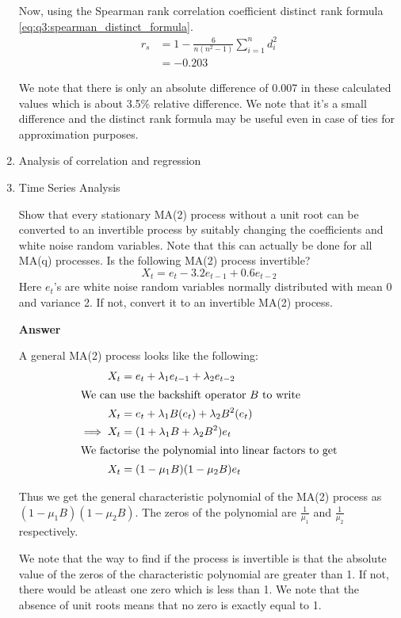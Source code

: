 \documentclass[12pt, oneside]{article}
\begin{document}
\begin{enumerate}
{    Now, using the Spearman rank correlation coefficient distinct rank formula
    \eqref{eq:q3:spearman_distinct_formula}.
    \begin{align*}
        r_s &= 1 - \frac{6}{n(n^2 - 1)} \sum_{i=1}^{n} d_i^2 \\
            &= -0.203
    \end{align*}

    We note that there is only an absolute difference of 0.007 in these calculated
    values which is about 3.5\% relative difference. We note that it's a small
    difference and the distinct rank formula may be useful even in case of ties
    for approximation purposes.
}

\item	Analysis of correlation and regression 


\item {
    Time Series Analysis

    Show that every stationary MA(2) process without a unit root can be converted to an invertible
    process by suitably changing the coefficients and white noise random variables.
    Note that this can actually be done for all MA(q) processes. Is the following
    MA(2) process invertible?
    \[X_t = e_t - 3.2 e_{t-1} + 0.6 e_{t-2}\]
    Here \(e_t\)'s are white noise random variables normally distributed with mean
    0 and variance 2. If not, convert it to an invertible MA(2) process.

    \textbf{Answer}

    A general MA(2) process looks like the following:
    \begin{align*}
        X_t &= e_t + \lambda_1 e_{t-1} + \lambda_2 e_{t-2} \\
        \intertext{We can use the backshift operator \(B\) to write}
        X_t &= e_t + \lambda_1 B(e_{t}) + \lambda_2 B^2(e_{t}) \\
        \implies X_t &= (1 + \lambda_1 B + \lambda_2 B^2) e_{t} \\
        \intertext{We factorise the polynomial into linear factors to get}
        X_t &= (1 - \mu_1 B)(1 - \mu_2 B) e_t
    \end{align*}

    Thus we get the general characteristic polynomial of the MA(2) process as
    \((1 - \mu_1 B)(1 - \mu_2 B)\). The zeros of the polynomial are \(\frac{1}{\mu_1}\)
    and \(\frac{1}{\mu_2}\) respectively.

    We note that the way to find if the process is invertible is that the absolute
    value of the zeros of the characteristic polynomial are greater than 1. If not, there would be atleast one zero which is less than 1. We note that the
    absence of unit roots means that no zero is exactly equal to 1.

}
\end{enumerate}
\end{document}
